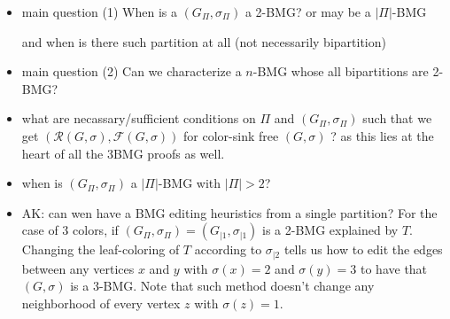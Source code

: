 \documentclass[final,3p,times]{elsarticle}
\newcommand{\TODO}[1]{\begingroup\color{red}#1\endgroup}
\newcommand{\mh}[1]{\begingroup\color{blue}#1\endgroup}
\begin{document}
\TODO{\smallskip
\begin{itemize}
	\item  main question (1) When is a $(G_{\Pi},\sigma_{\Pi})$ a 2-BMG? \mh{or may be a $|\Pi|$-BMG}
	
			and when is there such partition at all (not necessarily bipartition)
			
	\item  main question (2) Can we characterize a $n$-BMG whose all bipartitions are 2-BMG?

\item what are necassary/sufficient conditions on $\Pi$ and $(G_{\Pi},\sigma_{\Pi})$
such that we get $(\mathscr{R}(G,\sigma),\mathscr{F}(G,\sigma))$ for color-sink free $(G,\sigma)$
? as this lies at the heart of all the 3BMG proofs as well. 

\item when is  $(G_{\Pi},\sigma_{\Pi})$ a $|\Pi|$-BMG with $|\Pi| >2$? 

\item AK: can wen have a BMG editing heuristics from a single partition? For the case of $3$ colors, if $(G_{\Pi},\sigma_{\Pi})=(G_{|1},\sigma_{|1})$ is a 2-BMG explained by $T$. Changing the leaf-coloring of $T$ according to $\sigma_{|2}$ tells us how to edit the edges between any vertices $x$ and $y$ with $\sigma(x)=2$ and $\sigma(y)=3$ to have that $(G,\sigma)$ is a 3-BMG. Note that such method doesn't change any neighborhood of every vertex $z$ with $\sigma(z)=1$.

\end{itemize}
}
\end{document}
